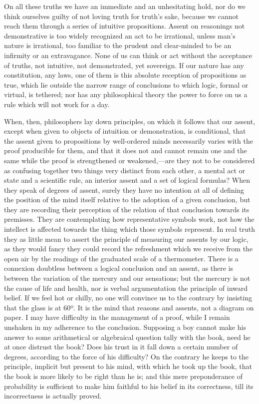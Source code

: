 On all these truths we have an immediate and an unhesitating hold,
nor do we think ourselves guilty of not loving truth for truth's sake,
because we cannot reach them through a series of intuitive
propositions. Assent on reasonings not demonstrative is too widely
recognized an act to be irrational, unless man's nature is irrational,
too familiar to the prudent and clear-minded to be an infirmity or an
extravagance. None of us can think or act without the acceptance of
truths, not intuitive, not demonstrated, yet sovereign. If our nature
has any constitution, any laws, one of them is this absolute reception
of propositions as true, which lie outside the narrow range of
conclusions to which logic, formal or virtual, is tethered; nor has
any philosophical theory the power to force on us a rule which will
not work for a day.

When, then, philosophers lay down principles, on which it follows
that our assent, except when given to objects of intuition or
demonstration, is conditional, that the assent given to propositions
by well-ordered minds necessarily varies with the proof producible for
them, and that it does not and cannot remain one and the same while
the proof is strengthened or weakened,—are they not to be considered
as confusing together two things very distinct from each other, a
mental act or state and a scientific rule, an interior assent and a
set of logical formulas? When they speak of degrees of assent, surely
they have no intention at all of defining the position of the mind
itself relative to the adoption of a given conclusion, but they are
recording their perception of the relation of that conclusion
towards its premisses. They are contemplating how representative
symbols work, not how the intellect is affected towards the thing
which those symbols represent. In real truth they as little mean to
assert the principle of measuring our assents by our logic, as they
would fancy they could record the refreshment which we receive from
the open air by the readings of the graduated scale of a thermometer.
There is a connexion doubtless between a logical conclusion and an
assent, as there is between the variation of the mercury and our
sensations; but the mercury is not the cause of life and health, nor
is verbal argumentation the principle of inward belief. If we feel hot
or chilly, no one will convince us to the contrary by insisting that
the glass is at 60º. It is the mind that reasons and assents, not a
diagram on paper. I may have difficulty in the management of a proof,
while I remain unshaken in my adherence to the conclusion. Supposing a
boy cannot make his answer to some arithmetical or algebraical
question tally with the book, need he at once distrust the book? Does
his trust in it fall down a certain number of degrees, according to
the force of his difficulty? On the contrary he keeps to the
principle, implicit but present to his mind, with which he took up the
book, that the book is more likely to be right than he is; and this
mere preponderance of probability is sufficient to make him faithful
to his belief in its correctness, till its incorrectness is actually
proved.

